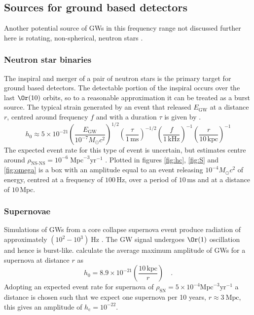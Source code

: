 \documentclass[fleqn,12pt]{iopart}
\newcommand{\Msun}{\ensuremath{M_{ \odot }}}
\newcommand{\sub}[1]{\ensuremath{_\mathrm{#1}}}
\begin{document}
\subsection{Sources for ground based detectors}
Another potential source of GWs in this frequency range not discussed further here is rotating, non-spherical, neutron stars \citep[see][]{Sturani2013}.

\subsubsection{Neutron star binaries}
The inspiral and merger of a pair of neutron stars is the primary target for ground based detectors. The detectable portion of the inspiral occurs over the last $\Or(10)$ orbits, so to a reasonable approximation it can be treated as a burst source. The typical strain generated by an event that released $E_{\textrm{GW}}$ at a distance $r$, centred around frequency $f$ and with a duration $\tau$ is given by \citet{Sturani2013}.
\begin{equation} h_{0}\approx 5\times 10^{-21}\left(\frac{E_{\textrm{GW}}}{10^{-7}\Msun c^{2}}\right)^{1/2}\left( \frac{\tau}{1\,\textrm{ms}} \right)^{-1/2}\left( \frac{f}{1\,\textrm{kHz}} \right)^{-1}\left( \frac{r}{10\,\textrm{kpc}} \right)^{-1} \end{equation}
The expected event rate for this type of event is uncertain, but estimates centre around $\rho_{\textrm{NS-NS}}=10^{-6}\;\textrm{Mpc}^{-3}\textrm{yr}^{-1}$ \citep{Andersson2011}. Plotted in figures \ref{fig:hc}, \ref{fig:S} and \ref{fig:omega} is a box with an amplitude equal to an event releasing $10^{-4}\Msun c^{2}$ of energy, centred at a frequency of $100\,\textrm{Hz}$, over a period of $10\,\textrm{ms}$ and at a distance of $10\,\textrm{Mpc}$.

\subsubsection{Supernovae}
Simulations of GWs from a core collapse supernova event produce radiation of approximately $(10^{2}-10^{3})~\textrm{Hz}$ \citep{Dimmelmeier2002}. The GW signal undergoes $\Or(1)$ oscillation and hence is burst-like. \citet{Dimmelmeier2002} calculate the average maximum amplitude of GWs for a supernova at distance $r$ as
\begin{equation} h_{0}=8.9\times 10^{-21}\left( \frac{10 \,\textrm{kpc}}{r} \right) \quad .\end{equation}
Adopting an expected event rate for supernova of $\rho_{\textrm{SN}}=5\times10^{-4}\textrm{Mpc}^{-3}\textrm{yr}^{-1}$ \citep{Sturani2013} a distance is chosen such that we expect one supernova per 10 years, $r\approx 3~\textrm{Mpc}$, this gives an amplitude of $h\sub{c}=10^{-22}$.
\end{document}
